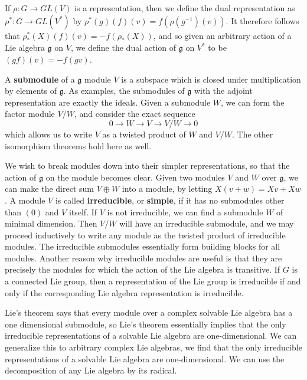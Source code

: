 \begin{example}
    If $\rho: G \to GL(V)$ is a representation, then we define the dual representation as $\rho^*: G \to GL(V^*)$ by $\rho^*(g)(f)(v) = f(\rho(g^{-1})(v))$. It therefore follows that $\rho^*_*(X)(f)(v) = -f(\rho_*(X))$, and so given an arbitrary action of a Lie algebra $\mathfrak{g}$ on $V$, we define the dual action of $\mathfrak{g}$ on $V^*$ to be $(gf)(v) = -f(gv)$.
\end{example}

A {\bf submodule} of a $\mathfrak{g}$ module $V$ is a subspace which is closed under multiplication by elements of $\mathfrak{g}$. As examples, the submodules of $\mathfrak{g}$ with the adjoint representation are exactly the ideals. Given a submodule $W$, we can form the factor module $V/W$, and consider the exact sequence
%
\[ 0 \to W \to V \to V/W \to 0 \]
%
which allows us to write $V$ as a twisted product of $W$ and $V/W$. The other isomorphism theorems hold here as well.

We wish to break modules down into their simpler representations, so that the action of $\mathfrak{g}$ on the module becomes clear. Given two modules $V$ and $W$ over $\mathfrak{g}$, we can make the direct sum $V \oplus W$ into a module, by letting $X(v + w) = Xv + Xw$. A module $V$ is called {\bf irreducible}, or {\bf simple}, if it has no submodules other than $(0)$ and $V$ itself. If $V$ is not irreducible, we can find a submodule $W$ of minimal dimension. Then $V/W$ will have an irreducible submodule, and we may proceed inductively to write any module as the twisted product of irreducible modules. The irreducible submodules essentially form building blocks for all modules. Another reason why irreducible modules are useful is that they are precisely the modules for which the action of the Lie algebra is transitive. If $G$ is a connected Lie group, then a representation of the Lie group is irreducible if and only if the corresponding Lie algebra representation is irreducible.

Lie's theorem says that every module over a complex solvable Lie algebra has a one dimensional submodule, so Lie's theorem essentially implies that the only irreducible representations of a solvable Lie algebra are one-dimensional. We can generalize this to arbitrary complex Lie algebras, we find that the only irreducible representations of a solvable Lie algebra are one-dimensional. We can use the decomposition of any Lie algebra by its radical.

